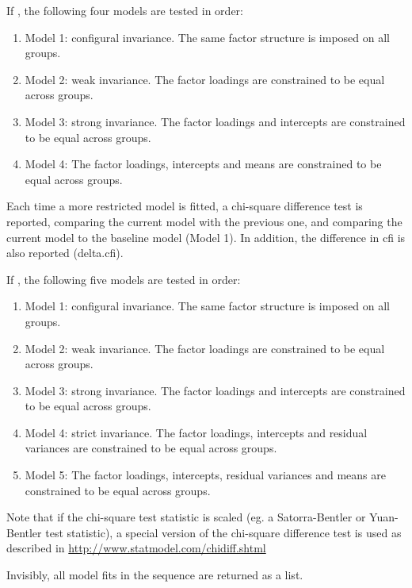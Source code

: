 \documentclass[a4paper]{book}
\begin{document}
\begin{Details}\relax
If , the following four models are tested in order:
\begin{enumerate}

\item Model 1: configural invariance. The same factor structure is imposed
on all groups.
\item Model 2: weak invariance. The factor loadings are constrained to be
equal across groups.
\item Model 3: strong invariance. The factor loadings and intercepts are
constrained to be equal across groups.
\item Model 4: The factor loadings, intercepts and means are constrained to
be equal across groups.

\end{enumerate}

Each time a more restricted model is fitted, a chi-square difference test
is reported, comparing the current model with the previous one, and comparing
the current model to the baseline model (Model 1). In addition, the difference
in cfi is also reported (delta.cfi).

If , the following five models are tested in order:
\begin{enumerate}

\item Model 1: configural invariance. The same factor structure is imposed
on all groups.
\item Model 2: weak invariance. The factor loadings are constrained to be
equal across groups.
\item Model 3: strong invariance. The factor loadings and intercepts are
constrained to be equal across groups.
\item Model 4: strict invariance. The factor loadings, intercepts and
residual variances are constrained to be equal across groups.
\item Model 5: The factor loadings, intercepts, residual variances and means
are constrained to be equal across groups.

\end{enumerate}


Note that if the chi-square test statistic is scaled (eg. a
Satorra-Bentler or Yuan-Bentler test statistic), a special version of the
chi-square difference test is used as described in
\url{http://www.statmodel.com/chidiff.shtml}
\end{Details}
%
\begin{Value}
Invisibly, all model fits in the sequence are returned as a list.
\end{Value}
\end{document}

